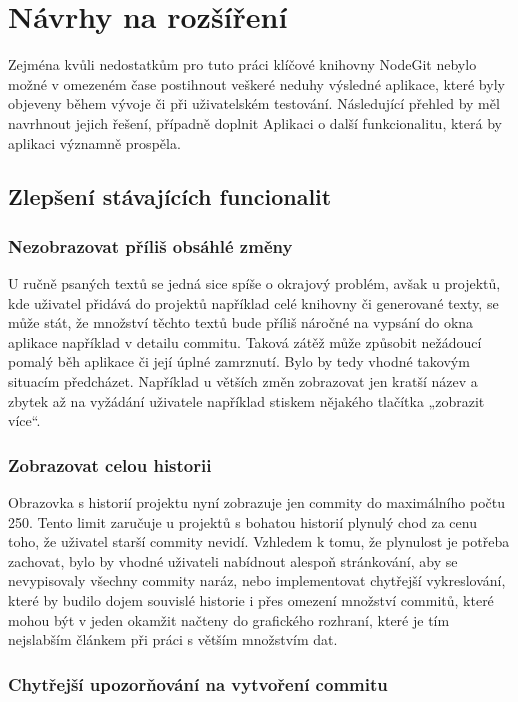 \chapter{Návrhy na rozšíření}

Zejména kvůli nedostatkům pro tuto práci klíčové knihovny NodeGit nebylo možné v omezeném čase postihnout veškeré neduhy výsledné aplikace, které byly objeveny během vývoje či při uživatelském testování. Následující přehled by měl navrhnout jejich řešení, případně doplnit Aplikaci o další funkcionalitu, která by aplikaci významně prospěla.


\section{Zlepšení stávajících funcionalit}

\subsection{Nezobrazovat příliš obsáhlé změny}

U ručně psaných textů se jedná sice spíše o okrajový problém, avšak u projektů, kde uživatel přidává do projektů například celé knihovny či generované texty, se může stát, že množství těchto textů bude příliš náročné na vypsání do okna aplikace například v detailu commitu. Taková zátěž může způsobit nežádoucí pomalý běh aplikace či její úplné zamrznutí. Bylo by tedy vhodné takovým situacím předcházet. Například u větších změn zobrazovat jen kratší název a zbytek až na vyžádání uživatele například stiskem nějakého tlačítka „zobrazit více“.

\subsection{Zobrazovat celou historii}

Obrazovka s historií projektu nyní zobrazuje jen commity do maximálního počtu 250. Tento limit zaručuje u projektů s bohatou historií plynulý chod za cenu toho, že uživatel starší commity nevidí. Vzhledem k tomu, že plynulost je potřeba zachovat, bylo by vhodné uživateli nabídnout alespoň stránkování, aby se nevypisovaly všechny commity naráz, nebo implementovat chytřejší vykreslování, které by budilo dojem souvislé historie i přes omezení množství commitů, které mohou být v jeden okamžit načteny do grafického rozhraní, které je tím nejslabším článkem při práci s větším množstvím dat.

\subsection{Chytřejší upozorňování na vytvoření commitu}

